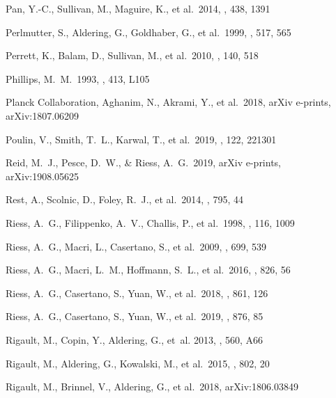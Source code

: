 \documentclass[]{aa} %
\begin{document}
\begin{thebibliography}{}
 Pan, Y.-C., Sullivan, M., Maguire, K., et al.\ 2014, \mnras, 438, 1391

 Perlmutter, S., Aldering, G., Goldhaber, G., et al.\ 1999, \apj, 517, 565

 Perrett, K., Balam, D., Sullivan, M., et al.\ 2010, \aj, 140, 518

 Phillips, M.~M.\ 1993, \apjl, 413, L105



 Planck Collaboration, Aghanim, N., Akrami, Y., et al.\ 2018, arXiv e-prints, arXiv:1807.06209

 Poulin, V., Smith, T.~L., Karwal, T., et al.\ 2019, \prl, 122, 221301

 Reid, M.~J., Pesce, D.~W., \& Riess, A.~G.\ 2019, arXiv e-prints, arXiv:1908.05625

 Rest, A., Scolnic, D., Foley, R.~J., et al.\ 2014, \apj, 795, 44

 Riess, A.~G., Filippenko, A.~V., Challis, P., et al.\ 1998, \aj, 116, 1009

 Riess, A.~G., Macri, L., Casertano, S., et al.\ 2009, \apj, 699, 539

 Riess, A.~G., Macri, L.~M., Hoffmann, S.~L., et al.\ 2016, \apj, 826, 56

 Riess, A.~G., Casertano, S., Yuan, W., et al.\ 2018, \apj, 861, 126

 Riess, A.~G., Casertano, S., Yuan, W., et al.\ 2019, \apj, 876, 85

Rigault, M., Copin, Y., Aldering, G., {et~al.} 2013, \aap, 560, A66

 Rigault, M., Aldering, G., Kowalski, M., et al.\ 2015, \apj, 802, 20

 Rigault, M.,
  Brinnel, V., Aldering, G., et al.\ 2018, arXiv:1806.03849


\end{thebibliography}
\end{document}
